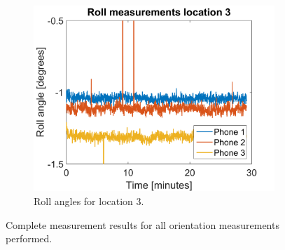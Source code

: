 \documentclass[a4paper, notitlepage]{report}
\begin{document}
\begin{figure}[H]
\begin{adjustwidth}{-1in}{-1in}
\begin{subfigure}{0.33\textwidth}
		\includegraphics[width=\textwidth]{figures/orientation/ro_loc3}
		\caption{Roll angles for location 3.}
		\label{app:orientation_ro_loc3}
	\end{subfigure}
\end{adjustwidth}
\caption[Complete orientation measurement results.]{Complete measurement results for all orientation measurements performed.}
\label{app:orientation_total}
\end{figure}
\end{document}
